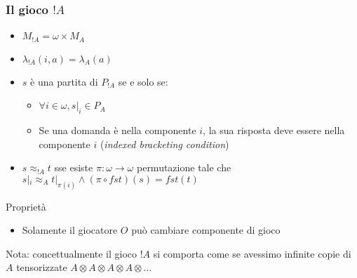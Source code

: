 \documentclass{beamer}
\begin{document}
\begin{frame}[t]






	
\end{frame}

\begin{frame}
	
	\frametitle{Il gioco $!A$}
	
	\begin{itemize}
		\item $M_{!A}=\omega \times M_A$
		\item $\lambda_{!A}(i,a)=\lambda_A(a)$
		\item $s$ è una partita di $P_{!A}$ se e solo se:
		\begin{itemize}
			\item $\forall i\in \omega , s|_i \in P_A$
			\item Se una domanda è nella componente $i$, la sua risposta deve essere nella componente $i$ (\emph{indexed bracketing condition})
		\end{itemize}

		\item $s\approx_{!A} t$ sse esiste $\pi:\omega \rightarrow \omega$ permutazione tale che $s|_i \approx_A t|_{\pi(i)} \wedge (\pi \circ fst)(s)=fst(t)$
	\end{itemize}
	
	\begin{block}{Proprietà}
		\begin{itemize}
			\item Solamente il giocatore $O$ può cambiare componente di gioco
		\end{itemize}
	\end{block}
	
	Nota: concettualmente il gioco $!A$ si comporta come se avessimo infinite copie di $A$ tensorizzate $A\otimes A\otimes A\otimes A\otimes \dots$
	
\end{frame}
\end{document}
